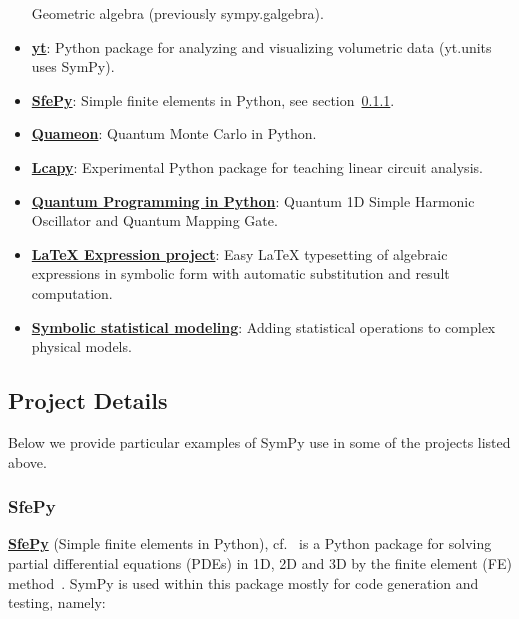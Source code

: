 \begin{itemize}
  Geometric algebra (previously sympy.galgebra).
\item
  \href{http://yt-project.org/}{\textbf{yt}}: Python package for
  analyzing and visualizing volumetric data (yt.units uses SymPy).
\item
  \href{http://sfepy.org/}{\textbf{SfePy}}: Simple finite elements in
  Python, see section~\ref{sfepy}.
\item
  \href{http://quameon.sourceforge.net/}{\textbf{Quameon}}: Quantum
  Monte Carlo in Python.
\item
  \href{http://lcapy.elec.canterbury.ac.nz/}{\textbf{Lcapy}}:
  Experimental Python package for teaching linear circuit analysis.
\item
  \href{http://digitalcommons.calpoly.edu/cgi/viewcontent.cgi?article=1072\&context=physsp/}{\textbf{Quantum
  Programming in Python}}: Quantum 1D Simple Harmonic Oscillator and
  Quantum Mapping Gate.
\item
  \href{http://mech.fsv.cvut.cz/~stransky/software/latexexpr/doc/}{\textbf{LaTeX
  Expression project}}: Easy LaTeX typesetting of algebraic expressions
  in symbolic form with automatic substitution and result computation.
\item
  \href{https://www.researchgate.net/publication/260585491_Symbolic_Statistics_with_SymPy/}{\textbf{Symbolic
  statistical modeling}}: Adding statistical operations to complex
  physical models.
\end{itemize}

\subsection{Project Details}\label{projects-details}

Below we provide particular examples of SymPy use in some of the projects
listed above.

\subsubsection{SfePy}\label{sfepy}

\href{http://sfepy.org/}{\textbf{SfePy}} (Simple finite elements in Python),
cf.~\cite{cimrman2014sfepy} is a Python package for solving partial
differential equations (PDEs) in 1D, 2D and 3D by the finite element (FE)
method~\cite{Zienkiewicz2013FEM}. SymPy is used within this package mostly for
code generation and testing, namely:

